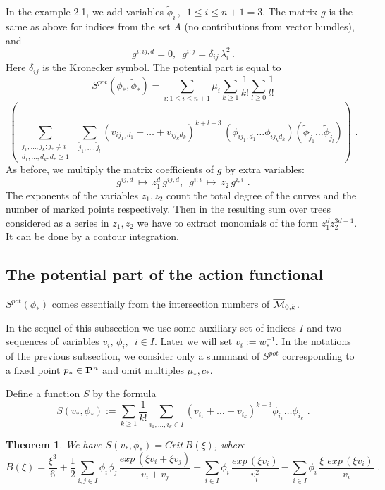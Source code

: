 \documentclass{amsart}
\newtheorem*{thm}{Theorem}
\begin{document}
In the example 2.1, we add variables $\tilde \phi_i\,,\,\,\,1\le i\le n+1=3$.
The matrix $g$ is the same as above for indices from the set $A$ (no
contributions from vector bundles), and
$$g^{i;ij,d}=0,\,\,\,g^{i:j}=\delta_{ij} \,\lambda _i^2\,.$$
Here $\delta_{ij}$ is the Kronecker symbol.
 The potential part is equal to
$$S^{pot}(\phi_*,\tilde\phi_*)=\sum_{i:1\le i\le n+1}\mu_i \sum_{k\ge 1}
\frac{1}{k!}\sum_{l\ge 0}\frac{1}{l!}$$
$$\left(\sum_{\substack{
j_1,\dots,j_k:j_*\ne i
\\ d_1,\dots ,d_k: d_*\ge 1
}}
\,\,\sum_{\tilde j_1,\dots,\tilde j_l}
(v_{i j_1,d_1}+\dots+v_{i j_k d_k})^{k+l-3}\,
(\phi_{i j_1,d_1}\dots \phi_{i j_k d_k})
(\tilde\phi_{\tilde j_1}\dots\tilde\phi_{\tilde j_l})\right)\,\,.$$
 As before, we multiply the matrix coefficients of $g$ by extra variables:
 $$g^{ij,d}\,\mapsto \, z_1^d\,g^{ij,d},\,\,\,g^{i;i}\,\mapsto\,
z_2\,g^{i,i}\,\,.$$
The exponents of the variables $z_1,z_2$ count the total degree of the curves
and the number of marked points respectively. Then in the resulting sum over
trees considered as a series in $z_1,z_2$ we have to extract monomials of the
form $z_1^d z_2^{3d-1}$. It can be done by a contour integration.






\subsection{The potential part of the action functional}

$S^{pot}(\phi_*)$ comes essentially  from  the intersection numbers of
$\M_{0,k}$.

In the sequel of this subsection we use some auxiliary set of indices $I$ and
two sequences of variables $v_i,\,\phi_i,\,\,\,i \in I$. Later we will set
$v_i:=w_*^{-1}$. In the notations of the previous subsection, we consider only
a summand of $S^{pot}$ corresponding to a fixed point $p_*\in \P^n$ and omit
multiples $\mu_*,c_*$.

Define a function $S$ by the formula
$$S(v_*,\phi_*):=\sum_{k\ge 1}\frac{1}{k!}\sum_{i_1,\dots,i_k \in I}
 (v_{i_1}+\dots+v_{i_k})^{k-3}
\phi_{i_1}\dots \phi_{i_k}\,\,.$$

\begin{thm} We have $S(v_*,\phi_*)=Crit\,B(\xi)$, where
$$B(\xi)=\frac{\xi^3}{6}+\frac{1}{2}\sum_{i,j\in I}
\phi_i \phi_j\,\frac{ exp\,(\xi v_i+\xi v_j)}{v_i+v_j}+
\sum_{i\in I} \phi_i\, \frac{exp\,(\xi v_i)}{v_i^2}-
\sum_{i\in I}\phi_i \,\frac{ \xi \,\,exp\,(\xi v_i)}{v_i}\,\,.$$
\end{thm}
\end{document}
